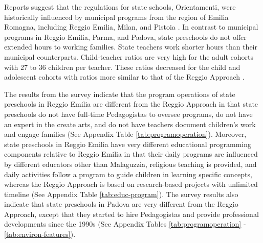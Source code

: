 %

Reports suggest that the regulations for state schools, Orientamenti, were historically influenced by municipal programs from the region of Emilia Romagna, including Reggio Emilia, Milan, and Pistoia \citep{OECD_2001_Italy-Country-Note}. In contrast to municipal programs in Reggio Emilia, Parma, and Padova, state preschools do not offer extended hours to working families. State teachers work shorter hours than their municipal counterparts. Child-teacher ratios are very high for the adult cohorts with 27 to 36 children per teacher. These ratios decreased for the child and adolescent cohorts with ratios more similar to that of the Reggio Approach \citep{Hohnerlein_2015_Development-and-Diffusion}. 


The results from the survey indicate that the program operations of state preschools in Reggio Emilia are different from the Reggio Approach in that state preschools do not have full-time Pedagogistas to oversee programs, do not have an expert in the create arts, and do not have teachers document children's work and engage families (See Appendix Table \ref{tab:programoperation}). Moreover, state preschools in Reggio Emilia have very different educational programming components relative to Reggio Emilia in that their daily programs are influenced by different educators other than Malaguzzia, religious teaching is provided, and daily activities follow a program to guide children in learning specific concepts, whereas the Reggio Approach is based on research-based projects with unlimited timeline (See Appendix Table \ref{tab:educ-program}). The survey results also indicate that state preschools in Padova are very different from the Reggio Approach, except that they started to hire Pedagogistas and provide professional developments since the 1990s (See Appendix Tables \ref{tab:programoperation} - \ref{tab:environ-features}).

